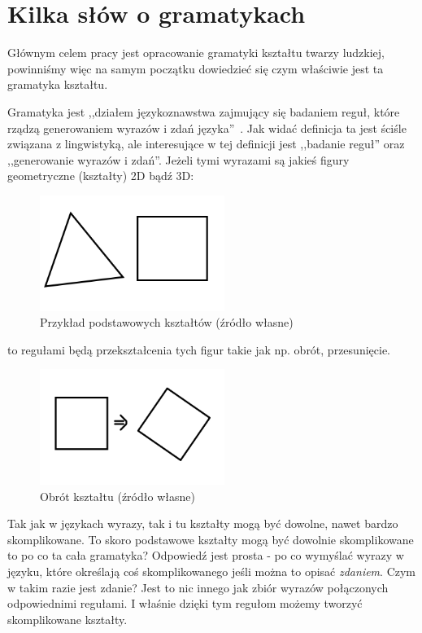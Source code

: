 \section{Kilka słów o gramatykach}
Głównym celem pracy jest opracowanie gramatyki kształtu twarzy ludzkiej,
powinniśmy więc na samym początku dowiedzieć się czym właściwie jest ta
gramatyka kształtu.

Gramatyka jest ,,działem językoznawstwa zajmujący się badaniem reguł, które
rządzą generowaniem wyrazów i zdań języka''~\cite{wiki01}. Jak widać definicja
ta jest ściśle związana z lingwistyką, ale interesujące w tej definicji jest ,,badanie reguł'' oraz ,,generowanie wyrazów i zdań''.
Jeżeli tymi wyrazami są jakieś figury geometryczne (kształty) 2D bądź 3D:

\begin{figure}[h!]
\centering
\includegraphics[width=6cm]{images/ksztalt.png}
\caption{Przykład podstawowych kształtów (źródło własne)}
\end{figure}
to regułami będą przekształcenia tych figur takie jak np. obrót, przesunięcie.

\begin{figure}[h!]
\centering
\includegraphics[width=6cm]{images/obrot.png}
\caption{Obrót kształtu (źródło własne)}
\end{figure}

Tak jak w językach wyrazy, tak i tu kształty mogą być dowolne, nawet bardzo
skomplikowane.
To skoro podstawowe kształty mogą być dowolnie skomplikowane to po co ta cała
gramatyka? Odpowiedź jest prosta - po co wymyślać wyrazy w języku, które
określają coś skomplikowanego jeśli można to opisać {\em zdaniem}. Czym w takim
razie jest zdanie? Jest to nic innego jak zbiór wyrazów połączonych
odpowiednimi regułami. I właśnie dzięki tym regułom możemy tworzyć
skomplikowane kształty.

